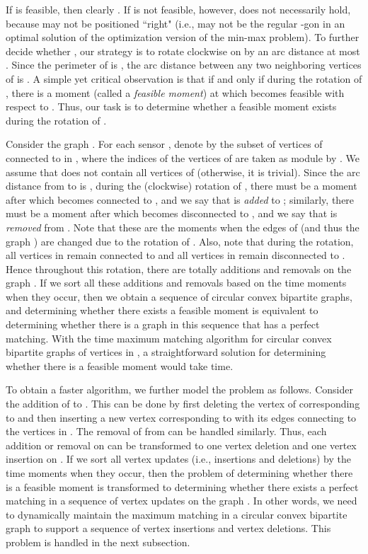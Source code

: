 \documentclass[11pt]{article}
\begin{document}
If  is feasible, then clearly .
If  is not feasible, however,  does not necessarily hold,
because  may not be positioned ``right" (i.e.,  may not be the regular
-gon in an optimal solution of
the optimization version of the min-max problem). To further
decide whether , our strategy is to rotate
 clockwise on  by an arc distance at most .
Since the perimeter of  is , the arc distance
between any two neighboring vertices of  is . A simple
yet critical observation is that  if and only
if during the rotation of , there is a moment (called a {\em
feasible moment}) at which 
becomes feasible with respect to . Thus, our task is to determine whether a feasible moment exists
during the rotation of .

Consider the graph . For each sensor , denote by
 the subset of vertices of  connected to
 in , where the indices of the vertices of  are
taken as module by . We assume that  does not contain all
vertices of  (otherwise, it is trivial). Since the arc distance
from  to  is , during the (clockwise) rotation
of , there must be a moment after which  becomes connected to
, and we say that  is {\em added} to ; similarly,
there must be a moment after which  becomes disconnected to ,
and we say that  is {\em removed} from .
Note that these are the moments when the edges of  (and thus the graph )
are changed due to the rotation of .  Also, note that during the rotation, all
vertices in  remain connected to  and
all vertices in  remain
disconnected to . Hence throughout this rotation,
there are totally  additions and  removals on the graph .
If we sort all these additions and removals based on the time
moments when they occur, then we obtain a sequence of  circular
convex bipartite graphs, and determining whether there exists a
feasible moment is equivalent to determining whether there is a graph
in this sequence that has a perfect matching. With the  time maximum matching
algorithm for circular convex bipartite graphs of  vertices in
\cite{ref:LiangCi95}, a straightforward solution for determining whether there
is a feasible moment would take  time.

To obtain a faster algorithm, we further model the problem as follows.
Consider the addition of  to . This can be done
by first deleting the vertex of  corresponding to  and
then inserting a new vertex corresponding to  with its edges connecting
to the vertices in .
The removal of  from  can be handled similarly. Thus,
each addition or removal on  can be transformed to one vertex
deletion and one vertex insertion on . If we sort all vertex
updates (i.e., insertions and deletions) by the time moments when
they occur, then the problem of determining whether there is a feasible moment is
transformed to determining whether there exists a perfect matching
in a sequence of vertex updates on the graph . In other words, we need to
dynamically maintain the maximum matching in a circular convex
bipartite graph to support a sequence of  vertex insertions and
 vertex deletions.  This problem is handled in the next
subsection.
\end{document}

